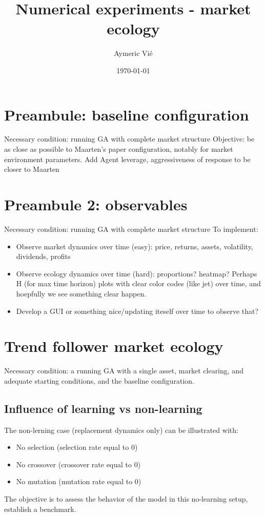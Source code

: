 \documentclass{article}
\title{Numerical experiments - market ecology}
\author{Aymeric Vi\'{e}}
\date{\today}
\begin{document}
\maketitle

\tableofcontents

\clearpage

\section{Preambule: baseline configuration}

Necessary condition: running GA with complete market structure
Objective: be as close as possible to Maarten's paper configuration, notably for market environment parameters.
Add Agent leverage, aggressiveness of response to be closer to Maarten
\section{Preambule 2: observables}

Necessary condition: running GA with complete market structure
To implement:
\begin{itemize}
    \item Observe market dynamics over time (easy): price, returns, assets, volatility, dividends, profits
    \item Observe ecology dynamics over time (hard): proportions? heatmap?
    Perhaps H (for max time horizon) plots with clear color codes (like jet) over time, and hoepfully we see something clear happen.
    \item Develop a GUI or something nice/updating iteself over time to observe that?
\end{itemize}

\section{Trend follower market ecology}

Necessary condition: a running GA with a single asset, market clearing, and adequate starting conditions, and the baseline configuration.

\subsection{Influence of learning vs non-learning}
The non-lerning case (replacement dynamics only) can be illustrated with:
\begin{itemize}
    \item No selection (selection rate equal to 0)
    \item No crossover (crossover rate equal to 0)
    \item No mutation (mutation rate equal to 0)
\end{itemize}
The objective is to assess the behavior of the model in this no-learning setup, establish a benchmark.
\end{document}
